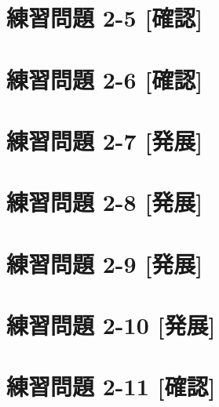 \documentclass[
]{book}
\begin{document}
\hypertarget{ux7df4ux7fd2ux554fux984c-2-5-ux78baux8a8d}{%
\section*{練習問題 2-5 {[}確認{]}}\label{ux7df4ux7fd2ux554fux984c-2-5-ux78baux8a8d}}

\hypertarget{ux7df4ux7fd2ux554fux984c-2-6-ux78baux8a8d}{%
\section*{練習問題 2-6 {[}確認{]}}\label{ux7df4ux7fd2ux554fux984c-2-6-ux78baux8a8d}}

\hypertarget{ux7df4ux7fd2ux554fux984c-2-7-ux767aux5c55}{%
\section*{練習問題 2-7 {[}発展{]}}\label{ux7df4ux7fd2ux554fux984c-2-7-ux767aux5c55}}

\hypertarget{ux7df4ux7fd2ux554fux984c-2-8-ux767aux5c55}{%
\section*{練習問題 2-8 {[}発展{]}}\label{ux7df4ux7fd2ux554fux984c-2-8-ux767aux5c55}}

\hypertarget{ux7df4ux7fd2ux554fux984c-2-9-ux767aux5c55}{%
\section*{練習問題 2-9 {[}発展{]}}\label{ux7df4ux7fd2ux554fux984c-2-9-ux767aux5c55}}

\hypertarget{ux7df4ux7fd2ux554fux984c-2-10-ux767aux5c55}{%
\section*{練習問題 2-10 {[}発展{]}}\label{ux7df4ux7fd2ux554fux984c-2-10-ux767aux5c55}}

\hypertarget{ux7df4ux7fd2ux554fux984c-2-11-ux78baux8a8d}{%
\section*{練習問題 2-11 {[}確認{]}}\label{ux7df4ux7fd2ux554fux984c-2-11-ux78baux8a8d}}
\end{document}

